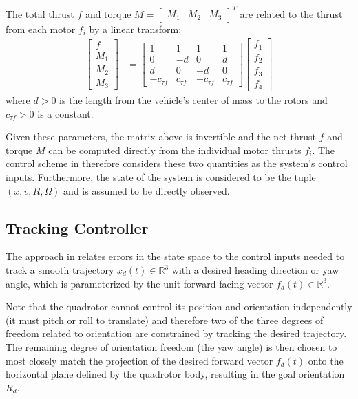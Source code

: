 \documentclass[paper=letter, fontsize=11pt]{scrartcl} %
\numberwithin{equation}{section} %
\numberwithin{figure}{section} %
\numberwithin{table}{section} %
\begin{document}
The total thrust $f$ and torque $M = \begin{bmatrix} M_1 & M_2 & M_3\end{bmatrix}^T$
are related to the thrust from each motor $f_i$ by a linear transform:
\begin{align}
  \begin{bmatrix}
    f \\
    M_1 \\
    M_2 \\
    M_3
  \end{bmatrix}
  &=
  \begin{bmatrix}
    1 & 1 & 1 & 1\\
    0 & -d & 0 & d \\
    d & 0 & -d & 0 \\
    -c_{\tau f} & c_{\tau f} & -c_{\tau f} & c_{\tau f}
  \end{bmatrix}
  \begin{bmatrix}
    f_1 \\
    f_2 \\
    f_3 \\
    f_4
  \end{bmatrix}
\end{align}
where $d > 0$ is the length from the vehicle's center of mass to the rotors and
$c_{\tau f} > 0$ is a constant.

Given these parameters, the matrix above is invertible and the net thrust $f$ and
torque $M$ can be computed directly from the individual motor thrusts $f_i$.
The control scheme in \cite{lee2010geometric} therefore considers these two
quantities as the system's control inputs. Furthermore, the state of the system is considered
to be the tuple $(x, v, R, \Omega)$ and is assumed to be directly observed.

\subsection{Tracking Controller}
The approach in \cite{lee2010geometric} relates errors in the state space to the
control inputs needed to track a smooth trajectory $x_d(t) \in \mathbb{R}^3$ with
a desired heading direction or yaw angle, which is parameterized by the unit forward-facing
vector $f_d(t) \in \mathbb{R}^3$.

Note that the quadrotor cannot control its
position and orientation independently (it must pitch or roll to translate) and
therefore two of the three degrees of freedom related to orientation are constrained
by tracking the desired trajectory. The remaining degree of orientation freedom
(the yaw angle) is then chosen to most closely match the projection of the
desired forward vector $f_d(t)$ onto the horizontal plane defined by the quadrotor
body, resulting in the goal orientation $R_d$.
\end{document}
